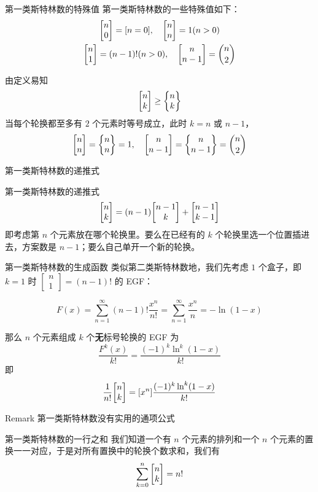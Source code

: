 \documentclass[UTF8]{beamer}
\begin{document}
    
    \begin{frame}{第一类斯特林数的特殊值}
        第一类斯特林数的一些特殊值如下：
        \begin{gather*}
        \st{n}{0} = [n=0],\quad \st{n}{n} = 1(n>0)\\ 
        \st{n}{1} = (n-1)!(n>0),\quad \st{n}{n-1} = \binom{n}{2}
        \end{gather*}

        \pause
        由定义易知
        $$
        \st nk \ge \St nk
        $$
        当每个轮换都至多有 $2$ 个元素时等号成立，此时 $k=n$ 或 $n-1$，
        $$
        \st{n}{n} = \St nn = 1,\quad  \st{n}{n-1} = \St{n}{n-1} = \binom{n}{2}
        $$

        
    \end{frame}

    \begin{frame}{第一类斯特林数的递推式}
        \begin{block}{第一类斯特林数的递推式}
            $$
            \st nk = (n-1)\st {n-1}k+\st{n-1}{k-1}
            $$
            即考虑第 $n$ 个元素放在哪个轮换里。要么在已经有的 $k$ 个轮换里选一个位置插进去，方案数是 $n-1$；要么自己单开一个新的轮换。
            \end{block}
    \end{frame}

    \begin{frame}{第一类斯特林数的生成函数}
        \pause
        类似第二类斯特林数地，我们先考虑 $1$ 个盒子，即 $k=1$ 时 $\begin{bmatrix}n\\1\end{bmatrix}=(n-1)!$ 的 EGF：

        $$
        F(x)=\sum_{n=1}^\infty(n-1)!\dfrac{x^n}{n!}=\sum\limits_{n=1}^\infty \dfrac{x^n}{n} = -\ln(1-x)
        $$

        那么 $n$ 个元素组成 $k$ 个\textbf{无}标号轮换的 EGF 为
        $$
        \frac{F^k(x)}{k!}=\frac{(-1)^k\ln^k(1-x)}{k!}
        $$
        即
        $$
        \frac{1}{n!}\st nk = [x^n]\frac{(-1)^k\ln^k(1-x)}{k!}
        $$
        \pause
        \begin{block}{Remark}
            第一类斯特林数没有实用的通项公式
        \end{block}

    \end{frame}

    \begin{frame}{第一类斯特林数的一行之和}
        我们知道一个有 $n$ 个元素的排列和一个 $n$ 个元素的置换一一对应，于是对所有置换中的轮换个数求和，我们有
        $$
        \sum_{k=0}^n \st nk = n!
        $$
    \end{frame}
\end{document}
